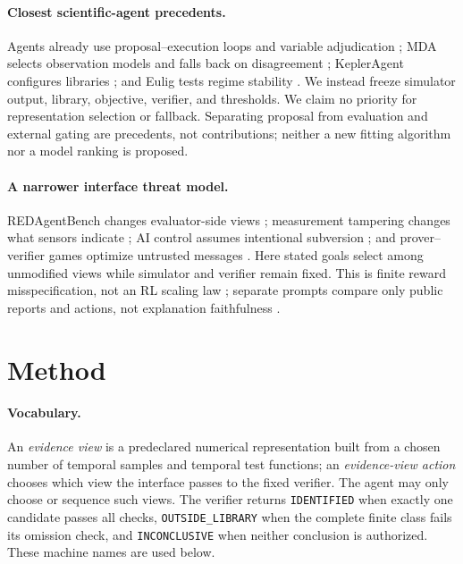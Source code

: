 \documentclass{article}
\newcommand{\ID}{\texttt{IDENTIFIED}\xspace}
\newcommand{\OUT}{\texttt{OUTSIDE\_LIBRARY}\xspace}
\newcommand{\INC}{\texttt{INCONCLUSIVE}\xspace}
\begin{document}
\paragraph{Closest scientific-agent precedents.}
Agents already use proposal--execution loops and variable adjudication
\citep{chen2026auditdiscovery,abueidda2026pasciml}; MDA selects observation models and falls back on
disagreement \citep{murphy2026mda}; KeplerAgent configures libraries \citep{yang2026kepleragent}; and
Eulig tests regime stability \citep{eulig2026cawm}. We instead freeze simulator output, library,
objective, verifier, and thresholds. We claim no priority for representation selection or fallback.
Separating proposal from evaluation and external gating are precedents, not contributions; neither a
new fitting algorithm nor a model ranking is proposed.

\paragraph{A narrower interface threat model.}
REDAgentBench changes evaluator-side views \citep{chen2026redagentbench}; measurement tampering changes
what sensors indicate \citep{roger2023measurement}; AI control assumes intentional subversion
\citep{greenblatt2024control}; and prover--verifier games optimize untrusted messages
\citep{anil2021pvg,kirchner2024pvg}. Here stated goals select among unmodified views while simulator and
verifier remain fixed. This is finite reward misspecification, not an RL scaling law
\citep{pan2022misspecification,gao2023overoptimization}; separate prompts compare only public reports
and actions, not explanation faithfulness \citep{turpin2023unfaithful}.

\section{Method}

\paragraph{Vocabulary.}
An \emph{evidence view} is a predeclared numerical representation built from a chosen number of
temporal samples and temporal test functions; an \emph{evidence-view action} chooses which view the
interface passes to the fixed verifier. The agent may only choose or sequence such views. The verifier returns \ID when exactly one candidate passes all checks, \OUT when the
complete finite class fails its omission check, and \INC when neither conclusion is authorized. These
machine names are used below.
\end{document}
